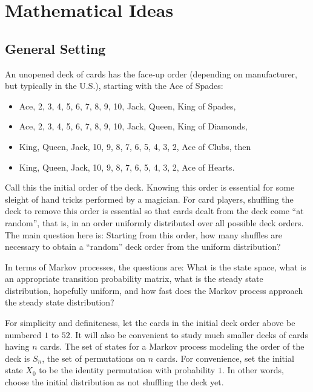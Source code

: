\documentclass[12pt]{article}
\begin{document}
\hr

\section*{Mathematical Ideas}

\subsection*{General Setting}

An unopened deck of cards has the face-up order (depending on
manufacturer, but typically in the U.S.), starting with the Ace of
Spades:
\begin{itemize}
    \item
        Ace, 2, 3, 4, 5, 6, 7, 8, 9, 10, Jack, Queen, King of Spades,
    \item
        Ace, 2, 3, 4, 5, 6, 7, 8, 9, 10, Jack, Queen, King of Diamonds,
    \item
        King, Queen, Jack, 10, 9, 8, 7, 6, 5, 4, 3, 2, Ace of Clubs,
        then
    \item
        King, Queen, Jack, 10, 9, 8, 7, 6, 5, 4, 3, 2, Ace of Hearts.
\end{itemize}
Call this the initial order of the deck.  Knowing this order is
essential for some sleight of hand tricks performed by a magician.  For
card players, shuffling the deck to remove this order is essential so
that cards dealt from the deck come ``at random'', that is, in an order
uniformly distributed over all possible deck orders. The main question
here is:  Starting from this order, how many shuffles are necessary to
obtain a ``random'' deck order from the uniform distribution?

In terms of Markov processes, the questions are:  What is the state
space, what is an appropriate transition probability matrix, what is the
steady state distribution, hopefully uniform, and how fast does the
Markov process approach the steady state distribution?

For simplicity and definiteness, let the cards in the initial deck order
above be numbered \( 1 \) to \( 52 \).  It will also be convenient to
study much smaller decks of cards having \( n \) cards.  The set of
states for a Markov process modeling the order of the deck is \( S_n \),
the set of permutations on \( n \) cards.  For convenience, set the
initial state \( X_0 \) to be the identity permutation with probability \(
1 \).  In other words, choose the initial distribution as not shuffling
the deck yet.
\end{document}
